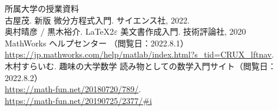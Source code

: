 \documentclass[11pt]{jsarticle}
\begin{document}
\clearpage
\begin{thebibliography}{99}
 所属大学の授業資料 \\
 古屋茂. 新版 微分方程式入門. サイエンス社, 2022. \\
 奥村晴彦 / 黒木裕介. \LaTeX2$\varepsilon$ 美文書作成入門. 技術評論社, 2020\\
 MathWorks ヘルプセンター （閲覧日：2022.8.1）\\
 \url{https://jp.mathworks.com/help/matlab/index.html?s_tid=CRUX_lftnav}.\\
 木村すらいむ. 趣味の大学数学 読み物としての数学入門サイト（閲覧日：2022.8.2）\\
 \url{https://math-fun.net/20180720/789/}.\\
 \url{https://math-fun.net/20190725/2377/#i}
\end{thebibliography}
\end{document}

